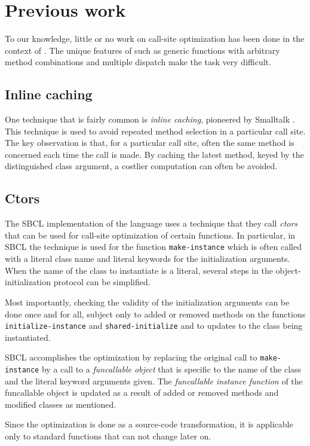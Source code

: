 \section{Previous work}

To our knowledge, little or no work on call-site optimization has been
done in the context of \commonlisp{}.  The unique features of
\commonlisp{} such as generic functions with arbitrary method
combinations and multiple dispatch make the task very difficult.

\subsection{Inline caching}

One technique that is fairly common is \emph{inline caching},
pioneered by Smalltalk \cite{Deutsch:1984:ES}.  This technique is used
to avoid repeated method selection in a particular call site.  The key
observation is that, for a particular call site, often the same method
is concerned each time the call is made.  By caching the latest
method, keyed by the distinguished class argument, a costlier
computation can often be avoided.

\subsection{Ctors}
\label{sec-previous-ctors}

The SBCL implementation of the \commonlisp{} language uses a technique
that they call \emph{ctors} that can be used for call-site
optimization of certain functions.  In particular, in SBCL the
technique is used for the function \texttt{make-instance} which is
often called with a literal class name and literal keywords for the
initialization arguments.  When the name of the class to instantiate
is a literal, several steps in the object-initialization protocol can
be simplified.

Most importantly, checking the validity of the initialization
arguments can be done once and for all, subject only to added or
removed methods on the functions \texttt{initialize-instance} and
\texttt{shared-initialize} and to updates to the class being
instantiated.

SBCL accomplishes the optimization by replacing the original call to
\texttt{make-instance} by a call to a \emph{funcallable object} that
is specific to the name of the class and the literal keyword arguments
given.  The \emph{funcallable instance function} of the funcallable
object is updated as a result of added or removed methods and modified
classes as mentioned.

Since the optimization is done as a source-code transformation, it is
applicable only to standard functions that can not change later on.

